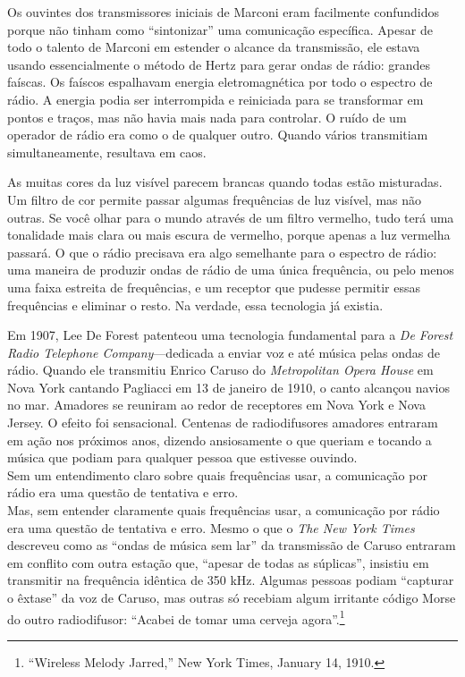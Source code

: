 \documentclass{book}
\newcommand{\ingles}[1]{\textit{#1}}
\begin{document}
Os ouvintes dos transmissores iniciais de Marconi eram facilmente confundidos
porque não tinham como ``sintonizar'' uma comunicação específica. Apesar de todo
o talento de Marconi em estender o alcance da transmissão, ele estava usando
essencialmente o método de Hertz para gerar ondas de rádio: grandes faíscas. Os
faíscos espalhavam energia eletromagnética por todo o espectro de rádio. A energia
podia ser interrompida e reiniciada para se transformar em pontos e traços, mas
não havia mais nada para controlar. O ruído de um operador de rádio era como o de
qualquer outro. Quando vários transmitiam simultaneamente, resultava em caos.

As muitas cores da luz visível parecem brancas quando todas estão misturadas. Um
filtro de cor permite passar algumas frequências de luz visível, mas não outras.
Se você olhar para o mundo através de um filtro vermelho, tudo terá uma tonalidade
mais clara ou mais escura de vermelho, porque apenas a luz vermelha passará. O
que o rádio precisava era algo semelhante para o espectro de rádio: uma maneira
de produzir ondas de rádio de uma única frequência, ou pelo menos uma faixa
estreita de frequências, e um receptor que pudesse permitir essas frequências e
eliminar o resto. Na verdade, essa tecnologia já existia.

Em 1907, Lee De Forest patenteou uma tecnologia fundamental para a \ingles{De
Forest Radio Telephone Company}---dedicada a enviar voz e até música pelas ondas
de rádio. Quando ele transmitiu Enrico Caruso do \ingles{Metropolitan Opera House}
em Nova York cantando Pagliacci em 13 de janeiro de 1910, o canto alcançou navios
no mar. Amadores se reuniram ao redor de receptores em Nova York e Nova Jersey.
O efeito foi sensacional. Centenas de radiodifusores amadores entraram em ação
nos próximos anos, dizendo ansiosamente o que queriam e tocando a música que
podiam para qualquer pessoa que estivesse ouvindo.\\

Sem um entendimento claro sobre quais frequências usar, a comunicação por rádio
era uma questão de tentativa e erro.\\

Mas, sem entender claramente quais frequências usar, a comunicação por rádio era
uma questão de tentativa e erro. Mesmo o que o \ingles{The New York Times} descreveu
como as ``ondas de música sem lar'' da transmissão de Caruso entraram em conflito
com outra estação que, ``apesar de todas as súplicas'', insistiu em transmitir na
frequência idêntica de 350 kHz. Algumas pessoas podiam ``capturar o êxtase'' da
voz de Caruso, mas outras só recebiam algum irritante código Morse do outro
radiodifusor: ``Acabei de tomar uma cerveja agora''.\footnote{``Wireless Melody
Jarred,'' New York Times, January 14, 1910.}
\end{document}
